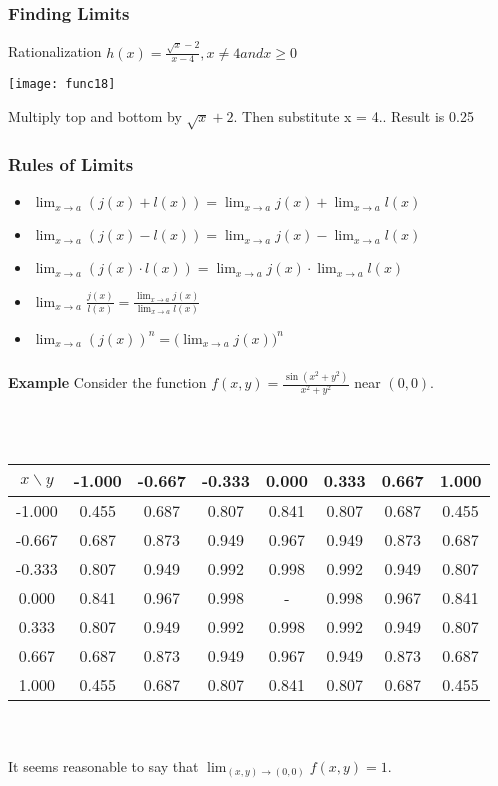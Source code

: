  \begin{frame}[fragile]\frametitle{Finding Limits}
Rationalization
$h(x) = \frac{\sqrt x - 2}{x - 4}, x \neq 4 and x \geq 0$
\begin{center}
\texttt{[image: func18]}
\end{center}
Multiply top and bottom by $\sqrt x + 2$. Then substitute x = 4.. Result is 0.25
\end{frame}


 \begin{frame}[fragile]\frametitle{Rules of Limits}
\begin{itemize}
\item $\lim_{x \to a} (j(x) + l(x)) = \lim_{x \to a} j(x) + \lim_{x \to a} l(x)$
\item $\lim_{x \to a} (j(x) - l(x)) = \lim_{x \to a} j(x) - \lim_{x \to a} l(x)$
\item $\lim_{x \to a} (j(x) \cdot l(x)) = \lim_{x \to a} j(x) \cdot \lim_{x \to a} l(x)$
\item $\lim_{x \to a} \frac{j(x)}{l(x)} = \frac{\lim_{x \to a} j(x)}{\lim_{x \to a} l(x)}$
\item $\lim_{x \to a} (j(x))^{n} = \Big(\lim_{x \to a} j(x)\Big)^{n}$
\end{itemize}

\end{frame}




\begin{frame}[fragile]\frametitle{}
 
\textbf{Example}
Consider the function $f(x,y)= \frac{\sin(x^2+y^2)}{x^2+y^2}$ near $(0,0)$.

\ \\  \ \\
\begin{tabular}{|c|c|c|c|c|c|c|c|}
\hline
$x\backslash y$&-1.000&-0.667&-0.333&0.000&0.333&0.667&1.000 \\ 
\hline
-1.000&0.455&0.687&0.807&0.841&0.807&0.687&0.455\\ 
\hline
-0.667&0.687&0.873&0.949&0.967&0.949&0.873&0.687\\ 
\hline
-0.333&0.807&0.949&0.992&0.998&0.992&0.949&0.807\\ 
\hline
0.000&0.841&0.967&0.998& - &0.998&0.967&0.841\\ 
\hline
0.333&0.807&0.949&0.992&0.998&0.992&0.949&0.807\\ 
\hline
0.667&0.687&0.873&0.949&0.967&0.949&0.873&0.687\\ 
\hline
1.000&0.455&0.687&0.807&0.841&0.807&0.687&0.455\\ 
\hline
\end{tabular} 
\  \\ \ \\
It seems reasonable to say that $\lim_{(x,y) \rightarrow (0,0)} f(x,y)=1$.


\end{frame}


